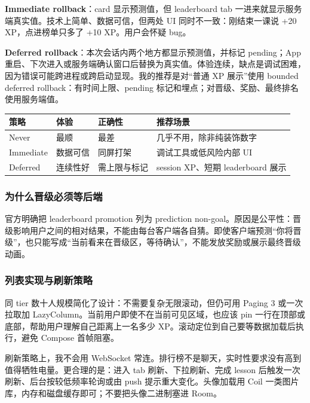 \textbf{Immediate rollback}：card 显示预测值，但 leaderboard tab 一进来就显示服务端真实值。技术上简单、数据可信，但两处 UI 同时不一致：刚结束一课说 +20 XP，点进榜单只多了 +10 XP。用户会怀疑 bug。

\textbf{Deferred rollback}：本次会话内两个地方都显示预测值，并标记 pending；App 重启、下次进入或服务端确认窗口后替换为真实值。体验连续，缺点是调试困难，因为错误可能跨进程或跨启动显现。我的推荐是对“普通 XP 展示”使用 bounded deferred rollback：有时间上限、pending 标记和埋点；对晋级、奖励、最终排名使用服务端值。

\begin{center}
\begin{tabularx}{\textwidth}{p{} X X X}
\toprule
策略 & 体验 & 正确性 & 推荐场景 \\
\midrule
Never & 最顺 & 最差 & 几乎不用，除非纯装饰数字 \\
Immediate & 数据可信 & 同屏打架 & 调试工具或低风险内部 UI \\
Deferred & 连续性好 & 需上限与标记 & session XP、短期 leaderboard 展示 \\
\bottomrule
\end{tabularx}
\end{center}

\subsubsection{为什么晋级必须等后端}

\srcofficial 官方明确把 leaderboard promotion 列为 prediction non-goal。原因是公平性：晋级影响用户之间的相对结果，不能由每台客户端各自猜。即使客户端预测“你将晋级”，也只能写成“当前看来在晋级区，等待确认”，不能发放奖励或展示最终晋级动画。

\subsubsection{列表实现与刷新策略}

同 tier 数十人规模简化了设计：不需要复杂无限滚动，但仍可用 Paging 3 或一次拉取加 LazyColumn。当前用户即使不在当前可见区域，也应该 pin 一行在顶部或底部，帮助用户理解自己距离上一名多少 XP。滚动定位到自己要等数据加载后执行，避免 Compose 首帧阻塞。

刷新策略上，我不会用 WebSocket 常连。排行榜不是聊天，实时性要求没有高到值得牺牲电量。更合理的是：进入 tab 刷新、下拉刷新、完成 lesson 后触发一次刷新、后台按较低频率轮询或由 push 提示重大变化。头像加载用 Coil 一类图片库\srcinferred，内存和磁盘缓存即可；不要把头像二进制塞进 Room。

